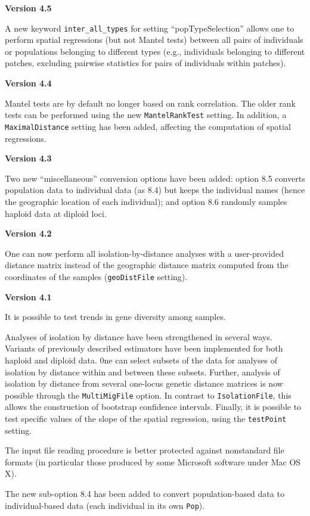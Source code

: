 \documentclass[12pt,]{book}
\begin{document}
\textbf{Version 4.5}

A new keyword \texttt{inter\_all\_types} for setting
``popTypeSelection'' allows one to perform spatial regressions (but not
Mantel tests) between all pairs of individuals or populations belonging
to different types (e.g., individuals belonging to different patches,
excluding pairwise statistics for pairs of individuals within patches).

\textbf{Version 4.4}

Mantel tests are by default no longer based on rank correlation. The
older rank tests can be performed using the new \texttt{MantelRankTest}
setting. In addition, a \texttt{MaximalDistance} setting has been added,
affecting the computation of spatial regressions.

\textbf{Version 4.3}

Two new ``miscellaneous'' conversion options have been added: option 8.5
converts population data to individual data (as 8.4) but keeps the
individual names (hence the geographic location of each individual); and
option 8.6 randomly samples haploid data at diploid loci.

\textbf{Version 4.2}

One can now perform all isolation-by-distance analyses with a
user-provided distance matrix instead of the geographic distance matrix
computed from the coordinates of the samples (\texttt{geoDistFile}
setting).

\textbf{Version 4.1}

It is possible to test trends in gene diversity among samples.

Analyses of isolation by distance have been strengthened in several
ways. Variants of previously described estimators have been implemented
for both haploid and diploid data. 0ne can select subsets of the data
for analyses of isolation by distance within and between these subsets.
Further, analysis of isolation by distance from several one-locus
genetic distance matrices is now possible through the
\texttt{MultiMigFile} option. In contrast to \texttt{IsolationFile},
this allows the construction of bootstrap confidence intervals. Finally,
it is possible to test specific values of the slope of the spatial
regression, using the \texttt{testPoint} setting.

The input file reading procedure is better protected against nonstandard
file formats (in particular those produced by some Microsoft software
under Mac OS X).

The new sub-option 8.4 has been added to convert population-based data
to individual-based data (each individual in its own \texttt{Pop}).
\end{document}
